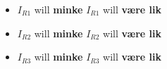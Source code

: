 \begin{itemize}
\item{} $I_{R1}$ will {\bf minke} \hskip 200pt $I_{R1}$ will {\bf være lik}
\item{} $I_{R2}$ will {\bf minke} \hskip 200pt $I_{R2}$ will {\bf være lik}
\item{} $I_{R3}$ will {\bf minke} \hskip 200pt $I_{R3}$ will {\bf være lik}
\end{itemize}




